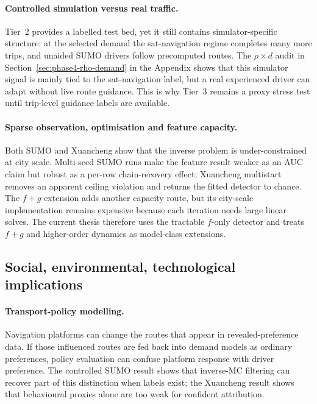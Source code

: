 \paragraph{Controlled simulation versus real traffic.} Tier~2 provides a
labelled test bed, yet it still contains simulator-specific structure:
at the selected demand the sat-navigation regime completes many more
trips, and unaided SUMO drivers follow precomputed routes. The
$\rho \times d$ audit in Section~\ref{sec:phase4-rho-demand} in the
Appendix shows that this simulator signal is mainly tied to the
sat-navigation label, but a real experienced driver can adapt without
live route guidance. This is why Tier~3 remains a proxy stress test until
trip-level guidance labels are available.

\paragraph{Sparse observation, optimisation and feature capacity.} Both
SUMO and Xuancheng show that the inverse problem is under-constrained at
city scale. Multi-seed SUMO runs make the feature result weaker as an AUC
claim but robust as a per-row chain-recovery effect; Xuancheng multistart
removes an apparent  ceiling violation and returns the
fitted detector to chance. The $f+g$ extension adds another capacity
route, but its city-scale implementation remains expensive because each
iteration needs large linear solves. The current thesis therefore uses
the tractable $f$-only detector and treats $f+g$ and higher-order dynamics
as model-class extensions.

\subsection{Social, environmental, technological implications}
\label{sec:disc-implications}

\paragraph{Transport-policy modelling.} Navigation platforms can change
the routes that appear in revealed-preference data. If those influenced
routes are fed back into demand models as ordinary preferences, policy
evaluation can confuse platform response with driver preference. The
controlled SUMO result shows that inverse-MC filtering can recover part
of this distinction when labels exist; the Xuancheng result shows that
behavioural proxies alone are too weak for confident attribution.

